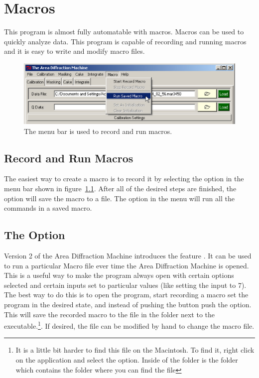 \chapter{Macros}

This program is almost fully automatable with macros. Macros
can be used to quickly analyze data. 
This program is capable of recording and running macros and
it is easy to write and modify macro files. 

\begin{figure}
    \centering
    \includegraphics[scale=.75]{figures/macro.eps}
    \caption{The  menu bar is used to
    record and run macros.}
    \label{macro_figure}
\end{figure}

\section{Record and Run Macros}

The easiest way to create a macro is to record it by selecting 
the  
option in the  menu 
bar shown in  figure~\ref{macro_figure}. 
After all of the desired steps are finished, 
the  option will save the macro to
a file. The  option in the 
menu will run all the commands in a saved macro. 


\section{\texorpdfstring{The  Option}
    {The ``Set As Initialization'' Option}}

Version 2 of the Area Diffraction Machine introduces the
feature . It can be used to run
a particular Macro file ever time the Area Diffraction Machine
is opened. This is a useful way to make the program always open
with certain options selected and certain inputs set to particular
values (like setting the  input to 7).
The best way to do this is to open the program, start recording a macro
set the program in the desired state, and instead of pushing
the  button push the 
 option. This will save the recorded macro to
the file  in the folder
 next to the executable.\footnote{It
is a little bit harder to find this file on the Macintosh.
To find it, right click on the application and 
select the 
option. Inside of the  folder is the folder 
 which contains the  folder where
you can find the file}. If desired, the 
file can be modified by hand to change the macro file. 

